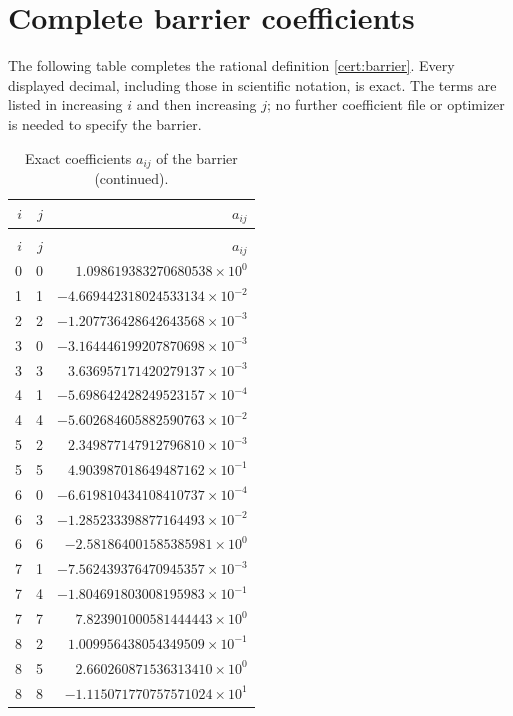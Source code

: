 \section{Complete barrier coefficients}
\label{cert:coefficients}

The following table completes the rational definition
\eqref{cert:barrier}.  Every displayed decimal, including those in
scientific notation, is exact.  The terms are listed in increasing $i$
and then increasing $j$; no further coefficient file or optimizer is
needed to specify the barrier.

\begingroup
\small
\begin{longtable}{rrr}
\caption{Exact coefficients $a_{ij}$ of the barrier.}\label{cert:barrier-coefficients}\\
\toprule $i$&$j$&$a_{ij}$\\\midrule
\endfirsthead
\caption[]{Exact coefficients $a_{ij}$ of the barrier (continued).}\\
\toprule $i$&$j$&$a_{ij}$\\\midrule
\endhead
0 & 0 & $1.098619383270680538\times10^{0}$ \\
1 & 1 & $-4.669442318024533134\times10^{-2}$ \\
2 & 2 & $-1.207736428642643568\times10^{-3}$ \\
3 & 0 & $-3.164446199207870698\times10^{-3}$ \\
3 & 3 & $3.636957171420279137\times10^{-3}$ \\
4 & 1 & $-5.698642428249523157\times10^{-4}$ \\
4 & 4 & $-5.602684605882590763\times10^{-2}$ \\
5 & 2 & $2.349877147912796810\times10^{-3}$ \\
5 & 5 & $4.903987018649487162\times10^{-1}$ \\
6 & 0 & $-6.619810434108410737\times10^{-4}$ \\
6 & 3 & $-1.285233398877164493\times10^{-2}$ \\
6 & 6 & $-2.581864001585385981\times10^{0}$ \\
7 & 1 & $-7.562439376470945357\times10^{-3}$ \\
7 & 4 & $-1.804691803008195983\times10^{-1}$ \\
7 & 7 & $7.823901000581444443\times10^{0}$ \\
8 & 2 & $1.009956438054349509\times10^{-1}$ \\
8 & 5 & $2.660260871536313410\times10^{0}$ \\
8 & 8 & $-1.115071770757571024\times10^{1}$ \\

\end{longtable}
